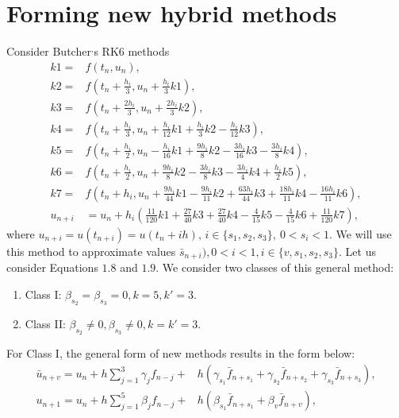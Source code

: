 \documentclass[11pt,twoside, final]{amsart}
\begin{document}
\section{\textbf{Forming  new hybrid methods} }\label{s2}
Consider Butcher$^{,}$s RK6 methods \cite{WBRk_6}
\begin{align}
    k1=& f(t_{n},u_{n}),\\\nonumber
    k2=& f(t_{n}+\frac{h_{i}}{3},u_{n}+\frac{h_{i}}{3}k1),\\\nonumber
    k3=& f(t_{n}+\frac{2h_{i}}{3},u_{n}+\frac{2h_{i}}{3}k2), \\\nonumber
    k4=& f(t_{n}+\frac{h_{i}}{3},u_{n}+\frac{h_{i}}{12}k1+\frac{h_{i}}{3}k2-\frac{h_{i}}{12}k3), \\\nonumber      
    k5=& f(t_{n}+\frac{h_{i}}{2},u_{n}-\frac{h_{i}}{16}k1+\frac{9h_{i}}{8}k2-\frac{3h_{i}}{16}k3-\frac{3h_{i}}{8}k4),\\\nonumber   
    k6=&  f(t_{n}+\frac{h_{i}}{2},u_{n}+\frac{9h_{i}}{8}k2-\frac{3h_{i}}{8}k3-\frac{3h_{i}}{4}k4+\frac{h_{i}}{2}k5), \\\nonumber
    k7=& f(t_{n}+h_{i},u_{n}+\frac{9h_{i}}{44}k1-\frac{9h_{i}}{11}k2+\frac{63h_{i}}{44}k3+\frac{18h_{i}}{11}k4-\frac{16h_{i}}{11}k6),\\\nonumber
    u_{n+i}&=u_{n}+h_{i}(\frac{11}{120}k1+\frac{27}{40}k3+\frac{27}{40}k4-\frac{4}{15}k5-\frac{4}{15}k6+\frac{11}{120}k7),
\end{align}
where
 $ u_{n+i}=u(t_{n+i})=u(t_{n}+ih),\,i\in \{s_{1},s_{2},s_{3}\},\ 0<s_{i}<1. $
 We will use this method to approximate values $ \bar{s}_{n+i}), 0<i<1, i\in \{v, s_{1}, s_{2}, s_{3}\}.$
\noindent
Let us consider Equations $1.8$ and $1.9$. We consider two classes of this general method:
\begin{enumerate}
\item Class I:  $\beta_{s_{2}}=\beta_{s_{3}}=0, k=5,k'=3.$ 
\item Class II: $\beta_{s_{2}}\neq 0, \beta_{s_{3}}\neq 0, k=k'=3.$ 
\end{enumerate}
For Class I, the general form of new methods results in the form below:
\begin{align}
 \bar{u}_{n+v}=u_{n}+h\sum_{j=1}^{3}\gamma_{j}f_{n-j}+ &  h(\gamma_{s_{1}}\bar{f}_{n+s_{1}}+\gamma_{s_{2}}\bar{f}_{n+s_{2}}+\gamma_{s_{3}}\bar{f}_{n+s_{3}}), \label{2.2}\\
u_{n+1}=u_{n}+h\sum_{j=1}^{5}\beta_{j}f_{n-j}+ &  h(\beta_{s_{1}}\bar{f}_{n+s_{1}}+\beta_{v}\bar{f}_{n+v}), \label{2.3}
\end{align}
\end{document}
